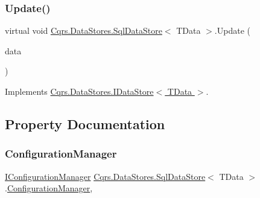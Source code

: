 \subsubsection{\texorpdfstring{Update()}{Update()}}
{\footnotesize\ttfamily virtual void \hyperlink{classCqrs_1_1DataStores_1_1SqlDataStore}{Cqrs.\+Data\+Stores.\+Sql\+Data\+Store}$<$ T\+Data $>$.Update (\begin{DoxyParamCaption}\item[{T\+Data}]{data }\end{DoxyParamCaption})\hspace{0.3cm}{\ttfamily [virtual]}}



Implements \hyperlink{interfaceCqrs_1_1DataStores_1_1IDataStore_a6d5d4dd572de8db01ff0c48d37faefa7_a6d5d4dd572de8db01ff0c48d37faefa7}{Cqrs.\+Data\+Stores.\+I\+Data\+Store$<$ T\+Data $>$}.



\subsection{Property Documentation}
\mbox{\label{classCqrs_1_1DataStores_1_1SqlDataStore_a9d720406a3c3abbd8bf1924bd81874ac_a9d720406a3c3abbd8bf1924bd81874ac}} 
\subsubsection{\texorpdfstring{Configuration\+Manager}{ConfigurationManager}}
{\footnotesize\ttfamily \hyperlink{interfaceCqrs_1_1Configuration_1_1IConfigurationManager}{I\+Configuration\+Manager} \hyperlink{classCqrs_1_1DataStores_1_1SqlDataStore}{Cqrs.\+Data\+Stores.\+Sql\+Data\+Store}$<$ T\+Data $>$.\hyperlink{classCqrs_1_1Configuration_1_1ConfigurationManager}{Configuration\+Manager}\hspace{0.3cm}{\ttfamily [get]}, {\ttfamily [protected]}}

\mbox{\label{classCqrs_1_1DataStores_1_1SqlDataStore_aa944d65b800ad9ba7809e96ed2b86f26_aa944d65b800ad9ba7809e96ed2b86f26}} 
